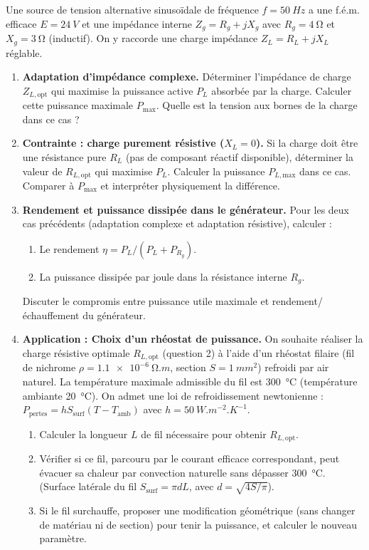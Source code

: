 \documentclass[11pt]{article}
\begin{document}
\begin{exercice}
Une source de tension alternative sinusoïdale de fréquence $f = \SI{50}{Hz}$ a une f.é.m. efficace $E = \SI{24}{V}$ et une impédance interne $Z_g = R_g + jX_g$ avec $R_g = \SI{4}{\ohm}$ et $X_g = \SI{3}{\ohm}$ (inductif). On y raccorde une charge impédance $Z_L = R_L + jX_L$ réglable.

\begin{enumerate}
\item \textbf{Adaptation d'impédance complexe.} 
Déterminer l'impédance de charge $Z_{L,\text{opt}}$ qui maximise la puissance active $P_L$ absorbée par la charge. Calculer cette puissance maximale $P_{\text{max}}$. Quelle est la tension aux bornes de la charge dans ce cas ?
\item \textbf{Contrainte : charge purement résistive ($X_L = 0$).} 
Si la charge doit être une résistance pure $R_L$ (pas de composant réactif disponible), déterminer la valeur de $R_{L,\text{opt}}$ qui maximise $P_L$. Calculer la puissance $P_{L,\text{max}}$ dans ce cas. Comparer à $P_{\text{max}}$ et interpréter physiquement la différence.
\item \textbf{Rendement et puissance dissipée dans le générateur.} 
Pour les deux cas précédents (adaptation complexe et adaptation résistive), calculer :
\begin{enumerate}[label=\alph*)]
\item Le rendement $\eta = P_L / (P_L + P_{R_g})$.
\item La puissance dissipée par joule dans la résistance interne $R_g$.
\end{enumerate}
Discuter le compromis entre puissance utile maximale et rendement/échauffement du générateur.
\item \textbf{Application : Choix d'un rhéostat de puissance.} 
On souhaite réaliser la charge résistive optimale $R_{L,\text{opt}}$ (question 2) à l'aide d'un rhéostat filaire (fil de nichrome $\rho = \SI{1,1e-6}{\ohm.m}$, section $S = \SI{1}{mm^2}$) refroidi par air naturel. La température maximale admissible du fil est \SI{300}{\celsius} (température ambiante \SI{20}{\celsius}). On admet une loi de refroidissement newtonienne : $P_{\text{pertes}} = h S_{\text{surf}} (T - T_{\text{amb}})$ avec $h = \SI{50}{W.m^{-2}.K^{-1}}$.
\begin{enumerate}[label=\alph*)]
\item Calculer la longueur $L$ de fil nécessaire pour obtenir $R_{L,\text{opt}}$.
\item Vérifier si ce fil, parcouru par le courant efficace correspondant, peut évacuer sa chaleur par convection naturelle sans dépasser \SI{300}{\celsius}. (Surface latérale du fil $S_{\text{surf}} = \pi d L$, avec $d = \sqrt{4S/\pi}$).
\item Si le fil surchauffe, proposer une modification géométrique (sans changer de matériau ni de section) pour tenir la puissance, et calculer le nouveau paramètre.
\end{enumerate}
\end{enumerate}
\end{exercice}
\end{document}
